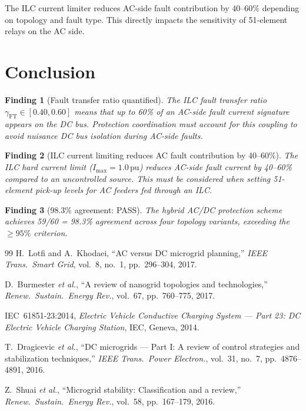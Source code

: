 \documentclass[11pt, a4paper]{article}
\newcommand{\pu}{\,\text{pu}}
\newtheorem{finding}{Finding}
\begin{document}
The ILC current limiter reduces AC-side fault contribution by $40$--$60\%$
depending on topology and fault type. This directly impacts the sensitivity
of 51-element relays on the AC side.

\section{Conclusion}
\label{sec:conclusion}

\begin{finding}[Fault transfer ratio quantified]
The ILC fault transfer ratio $\gamma_{\mathrm{FT}} \in [0.40, 0.60]$
means that up to 60\% of an AC-side fault current signature appears on the
DC bus. Protection coordination must account for this coupling to avoid
nuisance DC bus isolation during AC-side faults.
\end{finding}

\begin{finding}[ILC current limiting reduces AC fault contribution by 40--60\%]
The ILC hard current limit ($I_{\mathrm{max}} = 1.0\pu$) reduces AC-side fault
current by 40--60\% compared to an uncontrolled source. This must be considered
when setting 51-element pick-up levels for AC feeders fed through an ILC.
\end{finding}

\begin{finding}[98.3\% agreement: PASS]
The hybrid AC/DC protection scheme achieves 59/60 = 98.3\% agreement
across four topology variants, exceeding the $\geq 95\%$ criterion.
\end{finding}

\begin{thebibliography}{99}
H.~Lotfi and A.~Khodaei,
``AC versus DC microgrid planning,''
\emph{IEEE Trans.\ Smart Grid}, vol.~8, no.~1, pp.~296--304, 2017.

D.~Burmester \emph{et al.},
``A review of nanogrid topologies and technologies,''
\emph{Renew.\ Sustain.\ Energy Rev.}, vol.~67, pp.~760--775, 2017.

IEC~61851-23:2014, \emph{Electric Vehicle Conductive Charging System ---
Part 23: DC Electric Vehicle Charging Station}, IEC, Geneva, 2014.

T.~Dragicevic \emph{et al.},
``DC microgrids --- Part I: A review of control strategies and stabilization
techniques,''
\emph{IEEE Trans.\ Power Electron.}, vol.~31, no.~7, pp.~4876--4891, 2016.

Z.~Shuai \emph{et al.},
``Microgrid stability: Classification and a review,''
\emph{Renew.\ Sustain.\ Energy Rev.}, vol.~58, pp.~167--179, 2016.
\end{thebibliography}
\end{document}
